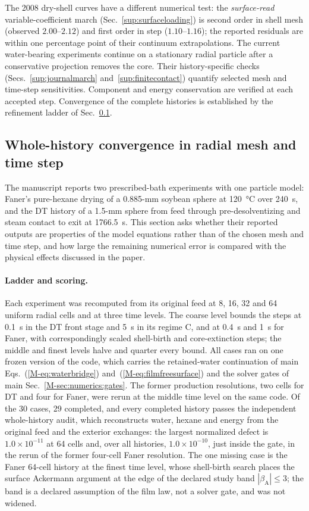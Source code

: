 \documentclass[11pt]{article}
\begin{document}
The 2008 dry-shell curves have a different numerical test: the \emph{surface-read} variable-coefficient march (Sec.~\ref{sup:surfaceloading}) is second order in shell mesh (observed $2.00$--$2.12$) and first order in step ($1.10$--$1.16$); the reported residuals are within one percentage point of their continuum extrapolations. The current water-bearing experiments continue on a stationary radial particle after a conservative projection removes the core. Their history-specific checks (Secs.~\ref{sup:journalmarch} and~\ref{sup:finitecontact}) quantify selected mesh and time-step sensitivities. Component and energy conservation are verified at each accepted step. Convergence of the complete histories is established by the refinement ladder of Sec.~\ref{sup:ladder}.

\subsection{Whole-history convergence in radial mesh and time step}
\label{sup:ladder}
The manuscript reports two prescribed-bath experiments with one particle
model: Faner's pure-hexane drying of a 0.885-mm soybean sphere at
\SI{120}{\celsius} over 240~s, and the DT history of a 1.5-mm sphere from
feed through pre-desolventizing and steam contact to exit at 1766.5~s.
This section asks whether their reported outputs are properties of the
model equations rather than of the chosen mesh and time step, and how
large the remaining numerical error is compared with the physical
effects discussed in the paper.

\paragraph{Ladder and scoring.}
Each experiment was recomputed from its original feed at 8, 16, 32 and
64 uniform radial cells and at three time levels. The coarse level bounds
the steps at \SI{0.1}{\second} in the DT front stage and \SI{5}{\second}
in its regime C, and at \SI{0.4}{\second} and \SI{1}{\second} for Faner,
with correspondingly scaled shell-birth and core-extinction steps; the
middle and finest levels halve and quarter every bound. All cases ran on
one frozen version of the code, which carries the retained-water
continuation of main Eqs.~(\ref*{M-eq:waterbridge})
and~(\ref*{M-eq:filmfreesurface}) and the solver gates of main
Sec.~\ref*{M-sec:numerics:gates}. The former production resolutions, two
cells for DT and four for Faner, were rerun at the middle time level on
the same code. Of the 30 cases, 29 completed, and every completed history
passes the independent whole-history audit, which reconstructs water,
hexane and energy from the original feed and the exterior exchanges: the
largest normalized defect is $1.0\times10^{-11}$ at 64 cells and, over
all histories, $1.0\times10^{-10}$, just inside the gate, in the rerun of
the former four-cell Faner resolution. The one missing case is the Faner 64-cell history at the
finest time level, whose shell-birth search places the surface Ackermann
argument at the edge of the declared study band $|\beta_{\mathrm A}|\le3$;
the band is a declared assumption of the film law, not a solver gate, and
was not widened.
\end{document}
